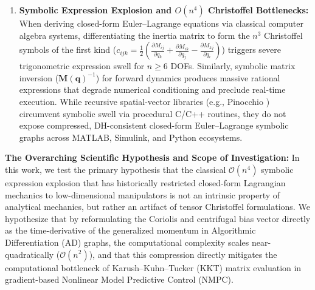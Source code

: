 \documentclass[fleqn,10pt]{article}
\begin{document}
\begin{enumerate}
		\item \textbf{Symbolic Expression Explosion and $O(n^4)$ Christoffel Bottlenecks:} When deriving closed-form Euler--Lagrange equations via classical computer algebra systems, differentiating the inertia matrix to form the $n^3$ Christoffel symbols of the first kind ($c_{ijk} = \frac{1}{2}(\frac{\partial M_{ij}}{\partial q_k} + \frac{\partial M_{ik}}{\partial q_j} - \frac{\partial M_{kj}}{\partial q_i})$) triggers severe trigonometric expression swell for $n \ge 6$ DOFs. Similarly, symbolic matrix inversion ($\bm{M}(\bm{q})^{-1}$) for forward dynamics produces massive rational expressions that degrade numerical conditioning and preclude real-time execution. While recursive spatial-vector libraries (e.g., Pinocchio \cite{carpentier2019pinocchio}) circumvent symbolic swell via procedural C/C++ routines, they do not expose compressed, DH-consistent closed-form Euler--Lagrange symbolic graphs across MATLAB, Simulink, and Python ecosystems.
	\end{enumerate}
	
	\noindent\textbf{The Overarching Scientific Hypothesis and Scope of Investigation:} 
	In this work, we test the primary hypothesis that the classical $\mathcal{O}(n^4)$ symbolic expression explosion that has historically restricted closed-form Lagrangian mechanics to low-dimensional manipulators is not an intrinsic property of analytical mechanics, but rather an artifact of tensor Christoffel formulations. We hypothesize that by reformulating the Coriolis and centrifugal bias vector directly as the time-derivative of the generalized momentum in Algorithmic Differentiation (AD) graphs, the computational complexity scales near-quadratically ($\mathcal{O}(n^2)$), and that this compression directly mitigates the computational bottleneck of Karush--Kuhn--Tucker (KKT) matrix evaluation in gradient-based Nonlinear Model Predictive Control (NMPC).
	
\end{document}
